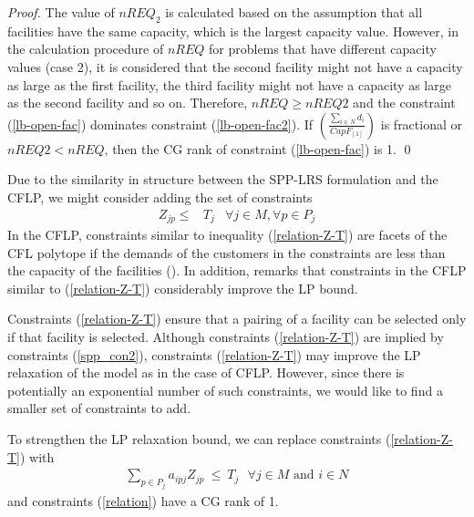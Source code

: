 \begin{proof}
The value of $nREQ_2$ is calculated based on the assumption that all facilities have the same capacity, which is 
the largest capacity value. However, in the calculation procedure of $nREQ$ for problems 
that have different capacity values (case 2), it is considered that the second facility might not have a capacity
as large as the first facility, the third facility might not have a capacity as large as the second facility and
so on.  Therefore, $nREQ \geq nREQ2$ and the constraint (\ref{lb-open-fac}) dominates constraint 
(\ref{lb-open-fac2}). If $\left(\frac{\sum_{i \in N }d_i}{CapF_{[1]}}\right)$ is fractional or 
$nREQ2<nREQ$, then the CG rank of constraint (\ref{lb-open-fac}) is 1. \qed
\end{proof}



Due to the similarity in structure between the SPP-LRS formulation and the CFLP, we might consider adding the set of constraints 
\begin{eqnarray}
Z_{jp} \leq & T_{j}  & \forall j \in M, \forall p \in P_{j} \label{relation-Z-T}
\end{eqnarray}
In the CFLP, constraints similar to inequality (\ref{relation-Z-T}) are facets of the CFL polytope if the
demands of the customers in the constraints are less than the capacity of the facilities (\citet{Leung}). 
In addition, \citet{Daskin} remarks that constraints in the CFLP similar to (\ref{relation-Z-T}) 
considerably improve the LP bound. 

Constraints (\ref{relation-Z-T})  ensure that a pairing of a facility can be selected only if that facility is 
selected. Although constraints (\ref{relation-Z-T}) are implied by constraints (\ref{spp_con2}),  
constraints (\ref{relation-Z-T}) may improve the LP relaxation of the model as in the case of 
CFLP. However, since there is potentially an exponential number of such constraints, we would
like to find a smaller set of constraints to add. 

\begin {prop} 
  To strengthen the LP relaxation bound, we can replace constraints (\ref{relation-Z-T}) with 
  \begin{eqnarray}
    \label{relation}
    \sum_{p \in P_{j}}a_{ipj}Z_{jp}\ \leq \ T_{j} \mbox{\ \ $\forall j \in M$ and $i \in N$} 
  \end{eqnarray}
and constraints (\ref{relation}) have a CG rank of 1.
\end{prop}
 
